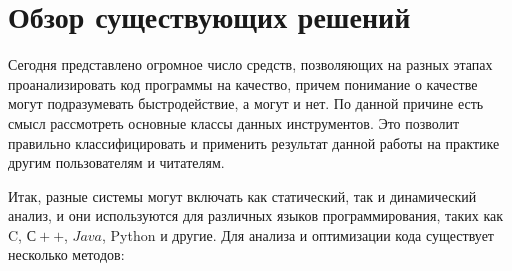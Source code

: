 \documentclass{mipt-thesis-bs}
\begin{document}
\chapter{Обзор существующих решений}
Сегодня представлено огромное число средств, позволяющих на разных этапах проанализировать код программы на качество,
причем понимание о качестве могут подразумевать быстродействие, а могут и нет. По данной причине есть смысл
рассмотреть основные классы данных инструментов. Это позволит правильно классифицировать и применить результат данной
работы на практике другим пользователям и читателям.

Итак, разные системы могут включать как статический, так и динамический анализ, и они
используются для различных языков программирования, таких как C, $С++$, $Java$, Python и другие.
Для анализа и оптимизации кода существует несколько методов:
\end{document}
